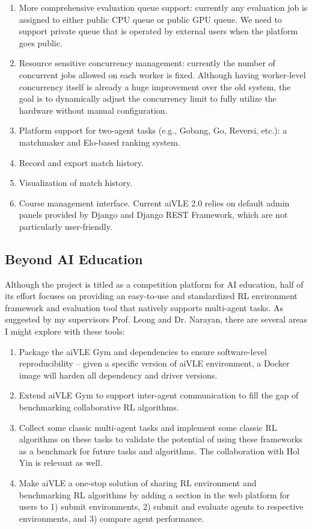 \documentclass[fyp]{socreport}
\begin{document}
\begin{enumerate}
    \item More comprehensive evaluation queue support: currently any evaluation job is assigned to either public CPU queue or public GPU queue. We need to support private queue that is operated by external users when the platform goes public.
    \item Resource sensitive concurrency management: currently the number of concurrent jobs allowed on each worker is fixed. Although having worker-level concurrency itself is already a huge improvement over the old system, the goal is to dynamically adjust the concurrency limit to fully utilize the hardware without manual configuration.
    \item Platform support for two-agent tasks (e.g., Gobang, Go, Reversi, etc.): a matchmaker and Elo-based ranking system.
    \item Record and export match history.
    \item Visualization of match history.
    \item Course management interface. Current aiVLE 2.0 relies on default admin panels provided by Django and Django REST Framework, which are not particularly user-friendly.
\end{enumerate}

\subsection{Beyond AI Education}
Although the project is titled as a competition platform for AI education, half of its effort focuses on providing an easy-to-use and standardized RL environment framework and evaluation tool that natively supports multi-agent tasks. As suggested by my supervisors Prof. Leong and Dr. Narayan, there are several areas I might explore with these tools:
\begin{enumerate}
    \item Package the aiVLE Gym and dependencies to ensure software-level reproducibility – given a specific version of aiVLE environment, a Docker image will harden all dependency and driver versions.
    \item Extend aiVLE Gym to support inter-agent communication to fill the gap of benchmarking collaborative RL algorithms.
    \item Collect some classic multi-agent tasks and implement some classic RL algorithms on these tasks to validate the potential of using these frameworks as a benchmark for future tasks and algorithms. The collaboration with Hol Yin is relevant as well.
    \item Make aiVLE a one-stop solution of sharing RL environment and benchmarking RL algorithms by adding a section in the web platform for users to 1) submit environments, 2) submit and evaluate agents to respective environments, and 3) compare agent performance.
\end{enumerate}
\end{document}
